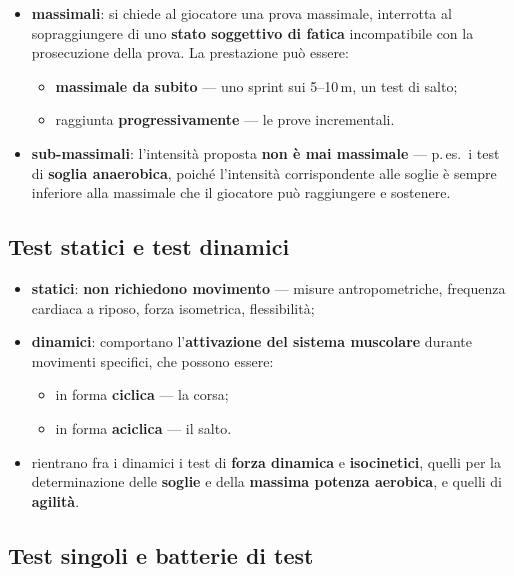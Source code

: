 \begin{itemize}
  \item \textbf{massimali}: si chiede al giocatore una prova massimale, interrotta al sopraggiungere
    di uno \textbf{stato soggettivo di fatica} incompatibile con la prosecuzione della prova. La
    prestazione può essere:
    \begin{itemize}
      \item \textbf{massimale da subito} --- uno sprint sui 5--10\,m, un test di salto;
      \item raggiunta \textbf{progressivamente} --- le prove incrementali.
    \end{itemize}
  \item \textbf{sub-massimali}: l'intensità proposta \textbf{non è mai massimale} --- p.\,es.\ i
    test di \textbf{soglia anaerobica}, poiché l'intensità corrispondente alle soglie è sempre
    inferiore alla massimale che il giocatore può raggiungere e sostenere.
\end{itemize}

\subsection{Test statici e test dinamici}

\begin{itemize}
  \item \textbf{statici}: \textbf{non richiedono movimento} --- misure antropometriche, frequenza
    cardiaca a riposo, forza isometrica, flessibilità;
  \item \textbf{dinamici}: comportano l'\textbf{attivazione del sistema muscolare} durante movimenti
    specifici, che possono essere:
    \begin{itemize}
      \item in forma \textbf{ciclica} --- la corsa;
      \item in forma \textbf{aciclica} --- il salto.
    \end{itemize}
  \item rientrano fra i dinamici i test di \textbf{forza dinamica} e \textbf{isocinetici}, quelli
    per la determinazione delle \textbf{soglie} e della \textbf{massima potenza aerobica}, e quelli
    di \textbf{agilità}.
\end{itemize}

\subsection{Test singoli e batterie di test}

